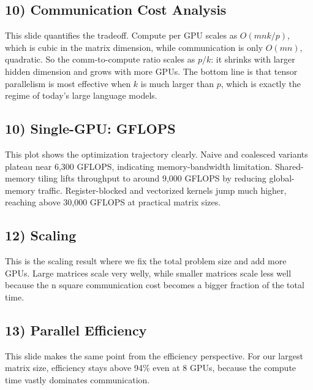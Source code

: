 \documentclass[11pt]{article}
\begin{document}
\subsection*{10) Communication Cost Analysis}
This slide quantifies the tradeoff. Compute per GPU scales as $O(mnk/p)$, which is cubic in the matrix dimension, while communication is only $O(mn)$, quadratic. So the comm-to-compute ratio scales as $p/k$: it shrinks with larger hidden dimension and grows with more GPUs. The bottom line is that tensor parallelism is most effective when $k$ is much larger than $p$, which is exactly the regime of today's large language models.


\subsection*{10) Single-GPU: GFLOPS}
This plot shows the optimization trajectory clearly. Naive and coalesced variants plateau near 6,300 GFLOPS, indicating memory-bandwidth limitation. Shared-memory tiling lifts throughput to around 9,000 GFLOPS by reducing global-memory traffic. Register-blocked and vectorized kernels jump much higher, reaching above 30,000 GFLOPS at practical matrix sizes.


\subsection*{12) Scaling}
This is the scaling result where we fix the total problem size and add more GPUs. Large matrices scale very welly, while smaller matrices scale less well because the n square communication cost becomes a bigger fraction of the total time.

\subsection*{13) Parallel Efficiency}
This slide makes the same point from the efficiency perspective. For our largest matrix size, efficiency stays above 94\% even at 8 GPUs, because the compute time vastly dominates communication.
\end{document}
